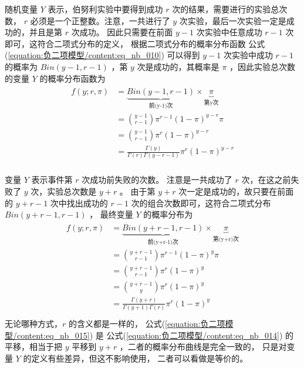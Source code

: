 \documentclass[letterpaper,10pt,english]{sphinxmanual}
\begin{document}
随机变量 \(Y\) 表示，伯努利实验中要得到成功 \(r\) 次的结果，需要进行的实验总次数，
\(r\) 必须是一个正整数。注意，一共进行了 \(y\) 次实验，最后一次实验一定是成功的，并且是第 \(r\) 次成功。
因此只需要在前面 \(y-1\) 次实验中任意成功 \(r-1\) 次即可，这符合二项式分布的定义，
根据二项式分布的概率分布函数 公式(\ref{equation:负二项模型/content:eq_nb_010}) 可以得到 \(y-1\) 次实验中成功 \(r-1\) 的概率为
\(Bin(y-1,r-1)\) ，第 \(y\) 次是成功的，其概率是 \(\pi\)
，因此实验总次数的变量 \(Y\) 的概率分布函数为
\begin{align}\label{equation:负二项模型/content:eq_nb_014}\!\begin{aligned}
f(y;r,\pi) & = \underbrace{Bin(y-1,r-1)}_{\text{前(y-1)次}} \times
\underbrace{\pi}_{\text{第y次}}\\
&= \binom{y-1}{r-1} \pi^{r-1}(1-\pi)^{y-r} \pi\\
&= \binom{y-1}{r-1} \pi^{r}(1-\pi)^{y-r}\\
&= \frac{\Gamma(y)}{\Gamma(r)\Gamma(y-r-1)  } \pi^{r}(1-\pi)^{y-r}\\
\end{aligned}\end{align}

变量 \(Y\) 表示事件第 \(r\) 次成功前失败的次数。
注意是一共成功了 \(r\) 次，在这之前失败了 \(y\) 次，实验总次数是 \(y+r\) 。
由于第 \(y+r\) 次一定是成功的，故只要在前面的 \(y+r-1\) 次中找出成功的 \(r-1\)
次的组合次数即可，这符合二项式分布 \(Bin(y+r-1,r-1)\) ，
最终变量 \(Y\) 的概率分布为
\begin{align}\label{equation:负二项模型/content:eq_nb_015}\!\begin{aligned}
f(y;r,\pi) &= \underbrace{ Bin(y+r-1,r-1) }_{\text{前(y+r-1)次}} \times
\underbrace{\pi}_{\text{第(y+r)次}}\\
&=\binom{y+r-1}{r-1} \pi^{r-1} (1-\pi)^{y} \pi\\
&=\binom{y+r-1}{r-1} \pi^{r} (1-\pi)^{y}\\
&=\binom{y+r-1}{y} \pi^{r} (1-\pi)^{y}\\
&= \frac{\Gamma(y+r)  }{\Gamma(y+1)\Gamma(r)}  \pi^{r}(1-\pi)^{y}\\
\end{aligned}\end{align}
无论哪种方式，\(r\) 的含义都是一样的，
公式(\ref{equation:负二项模型/content:eq_nb_015}) 是 公式(\ref{equation:负二项模型/content:eq_nb_014}) 的平移，相当于把 \(y\)
平移到 \(y+r\) ，二者的概率分布曲线是完全一致的，
只是对变量 \(Y\) 的定义有些差异，但这不影响使用，
二者可以看做是等价的。
\end{document}

